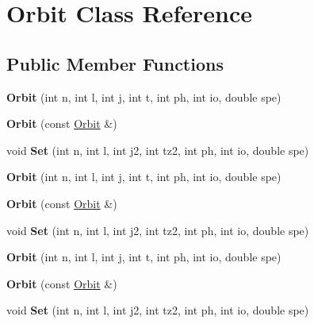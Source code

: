 \hypertarget{classOrbit}{\section{Orbit Class Reference}
\label{classOrbit}
}
\subsection*{Public Member Functions}
\begin{DoxyCompactItemize}
\item 
\hypertarget{classOrbit_a98ba429b53cb4efbb7468c6c16f1cb7e}{{\bfseries Orbit} (int n, int l, int j, int t, int ph, int io, double spe)}\label{classOrbit_a98ba429b53cb4efbb7468c6c16f1cb7e}

\item 
\hypertarget{classOrbit_acc12b8fdfccd5dc2aacbf06baa7a9d03}{{\bfseries Orbit} (const \hyperlink{classOrbit}{Orbit} \&)}\label{classOrbit_acc12b8fdfccd5dc2aacbf06baa7a9d03}

\item 
\hypertarget{classOrbit_a014860cec0609f01decf083eba7033b0}{void {\bfseries Set} (int n, int l, int j2, int tz2, int ph, int io, double spe)}\label{classOrbit_a014860cec0609f01decf083eba7033b0}

\item 
\hypertarget{classOrbit_a98ba429b53cb4efbb7468c6c16f1cb7e}{{\bfseries Orbit} (int n, int l, int j, int t, int ph, int io, double spe)}\label{classOrbit_a98ba429b53cb4efbb7468c6c16f1cb7e}

\item 
\hypertarget{classOrbit_acc12b8fdfccd5dc2aacbf06baa7a9d03}{{\bfseries Orbit} (const \hyperlink{classOrbit}{Orbit} \&)}\label{classOrbit_acc12b8fdfccd5dc2aacbf06baa7a9d03}

\item 
\hypertarget{classOrbit_a014860cec0609f01decf083eba7033b0}{void {\bfseries Set} (int n, int l, int j2, int tz2, int ph, int io, double spe)}\label{classOrbit_a014860cec0609f01decf083eba7033b0}

\item 
\hypertarget{classOrbit_a98ba429b53cb4efbb7468c6c16f1cb7e}{{\bfseries Orbit} (int n, int l, int j, int t, int ph, int io, double spe)}\label{classOrbit_a98ba429b53cb4efbb7468c6c16f1cb7e}

\item 
\hypertarget{classOrbit_acc12b8fdfccd5dc2aacbf06baa7a9d03}{{\bfseries Orbit} (const \hyperlink{classOrbit}{Orbit} \&)}\label{classOrbit_acc12b8fdfccd5dc2aacbf06baa7a9d03}

\item 
\hypertarget{classOrbit_a014860cec0609f01decf083eba7033b0}{void {\bfseries Set} (int n, int l, int j2, int tz2, int ph, int io, double spe)}\label{classOrbit_a014860cec0609f01decf083eba7033b0}

\end{DoxyCompactItemize}
